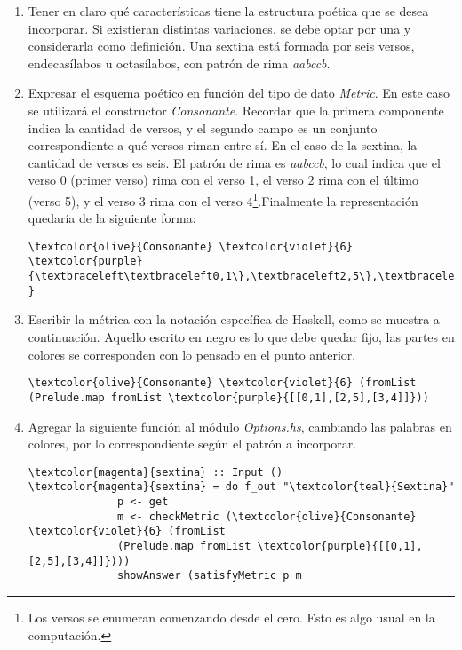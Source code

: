 \documentclass[12pt, a4paper]{article}
\begin{document}
\begin{enumerate}
	\item Tener en claro qué características tiene la estructura poética que se desea incorporar. Si existieran distintas variaciones, se debe optar por una y considerarla como definición. Una sextina está formada por seis versos, endecasílabos u octasílabos, con patrón de rima \textit{aabccb}.
	\item Expresar el esquema poético en función del tipo de dato \textit{Metric}. En este caso se utilizará el constructor \textit{Consonante}. Recordar que la primera componente indica la cantidad de versos, y el segundo campo es un conjunto correspondiente a qué versos riman entre sí. En el caso de la sextina, la cantidad de versos es seis. El patrón de rima es \textit{aabccb}, lo cual indica que el verso 0 (primer verso) rima con el verso 1, el verso 2 rima con el último (verso 5), y el verso 3 rima con el verso 4\footnote{Los versos se enumeran comenzando desde el cero. Esto es algo usual en la computación.}.Finalmente la representación quedaría de la siguiente forma:
\begin{Verbatim}[commandchars=\\\{\}]
   \textcolor{olive}{Consonante} \textcolor{violet}{6} \textcolor{purple}{\textbraceleft\textbraceleft0,1\},\textbraceleft2,5\},\textbraceleft3,4\}\} }
\end{Verbatim}
	\item Escribir la métrica con la notación específica de Haskell, como se muestra a continuación. Aquello escrito en negro es lo que debe quedar fijo, las partes en colores se corresponden con lo pensado en el punto anterior.
	
\begin{Verbatim}[commandchars=\\\{\}]
\textcolor{olive}{Consonante} \textcolor{violet}{6} (fromList (Prelude.map fromList \textcolor{purple}{[[0,1],[2,5],[3,4]]}))
\end{Verbatim}		

	\item Agregar la siguiente función al módulo \textit{Options.hs}, cambiando las palabras en colores, por lo correspondiente según el patrón a incorporar.
	
\begin{Verbatim}[commandchars=\\\{\}]
\textcolor{magenta}{sextina} :: Input ()
\textcolor{magenta}{sextina} = do f_out "\textcolor{teal}{Sextina}"
              p <- get
              m <- checkMetric (\textcolor{olive}{Consonante} \textcolor{violet}{6} (fromList 
              (Prelude.map fromList \textcolor{purple}{[[0,1],[2,5],[3,4]]})))
              showAnswer (satisfyMetric p m
\end{Verbatim}	


\end{enumerate}
\end{document}
